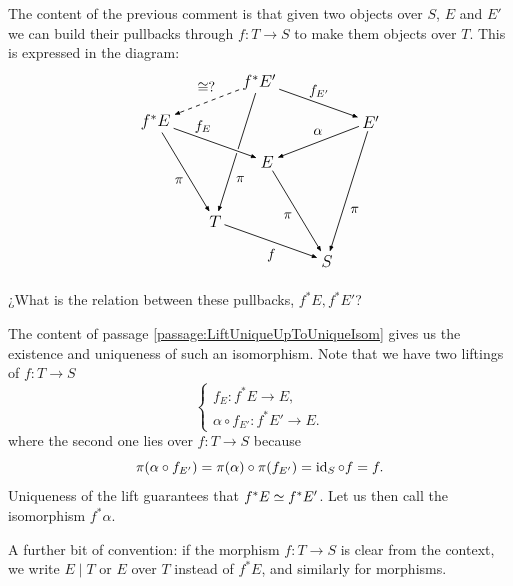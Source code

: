 \documentclass[12pt]{memoir}
\newcounter{passage}
\begin{document}
\begin{ptcb}
    The content of the previous comment is that given two objects over \(S\), \(E\) and \(E'\) we can build their pullbacks through \(f:T\to S\) to make them objects over \(T\). This is expressed in the diagram:
    \[
    \begin{tikzpicture}[
        arrows={-{Latex[length=1.6mm]}},
        line width=.6pt,
        every node/.style={inner sep=2pt,font=\large}
    ]
        \node (Ef)  at (0,2)       {$f^*E$};
        \node (Efp) at (2.6,3)     {$f^*E'$};
        \node (E)   at (2.8,1)     {$E$};
        \node (Ep)  at (5.4,2)     {$E'$};
        \node (T)   at (1.5,-.5)   {$T$};
        \node (S)   at (4.3,-1.5)  {$S$};

        \begin{scope}[every node/.append style={font=\normalsize}]
        \draw (Ef)  -- node[pos=.6,left,xshift=-.3em] {$\pi$} (T);
        \draw (Efp) -- node[pos=.72,right,xshift=.3em] {$\pi$} (T);
        \draw (E)   -- node[pos=.55,left,xshift=-.3em] {$\pi$} (S);
        \draw (Ep)  -- node[pos=.65,right,xshift=.3em] {$\pi$} (S);
        \draw (T)   -- node[below,yshift=-.3em] {$f$} (S);

        \draw[dashed] (Efp) -- node[above,yshift=.5em] {$\cong?$} (Ef);
        \draw (Efp) -- node[above,yshift=.2em] {$f_{E'}$} (Ep);
        \draw (Ep)  -- node[above,yshift=.3em] {$\alpha$} (E);
        \draw[preaction={draw=white,line width=3pt,arrows=-}]
            (Ef) -- node[pos=.35,above,yshift=.2em] {$f_E$} (E);
        \end{scope}
    \end{tikzpicture}
    \]
    \begin{Qn}
        ¿What is the relation between these pullbacks, \(f^\ast E, f^\ast E'\)?
    \end{Qn}
    The content of passage \ref{passage:LiftUniqueUpToUniqueIsom} gives us the existence and uniqueness of such an isomorphism. Note that we have two liftings of \(f:T\to S\)
    \[
        \begin{cases}
        f_E:f^\ast E\to E,\\
        \alpha\circ f_{E'}:f^\ast E'\to E.
        \end{cases}
    \]
    where the second one lies over \(f:T\to S\) because
    \[
        \pi(\alpha\circ f_{E'})=\pi(\alpha)\circ\pi(f_{E'})=\operatorname{id}_S\circ f=f.
    \]
    Uniqueness of the lift guarantees that \(f^\ast E\simeq f^\ast E'\). Let us then call the isomorphism \(f^\ast\alpha\).
\end{ptcb}
A further bit of convention: if the morphism $f\colon T \to S$ is clear from the context, we write $E \mid T$ or $E$ over $T$ instead of $f^* E$, and similarly for morphisms.
\end{document}
